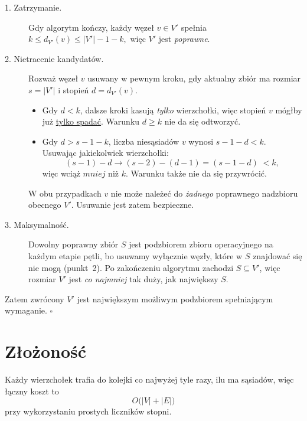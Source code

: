 \documentclass[11pt,a4paper]{article}
\begin{document}
\begin{description}
\item[1. Zatrzymanie.]
   Gdy algorytm kończy, każdy węzeł $v\in V'$
   spełnia
   \(
     k\le d_{V'}(v)\le |V'|-1-k,
   \)
   więc $V'$ jest \emph{poprawne}.

\item[2. Nietracenie kandydatów.]
   Rozważ węzeł $v$ usuwany w pewnym kroku,
   gdy aktualny zbiór ma rozmiar $s=|V'|$ i
   stopień $d=d_{V'}(v)$.

   \begin{itemize}
   \item Gdy $d<k$,
         dalsze kroki kasują \emph{tylko} wierzchołki,
         więc stopień $v$ mógłby już
         \underline{tylko spadać}.
         Warunku $d\ge k$ nie da się odtworzyć.

   \item Gdy $d> s-1-k$,
         liczba niesąsiadów $v$ wynosi
         $s-1-d<k$.
         Usuwając jakiekolwiek wierzchołki:
         \[
           (s-1)\!-\!d \longrightarrow (s-2)\!-\!(d-1)
           =(s-1-d)\;<k,
         \]
         więc wciąż $mniej$ niż $k$.
         Warunku także nie da się przywrócić.
   \end{itemize}
   W obu przypadkach $v$ nie może należeć
   do \emph{żadnego} poprawnego nadzbioru
   obecnego $V'$.  Usuwanie jest zatem bezpieczne.

\item[3. Maksymalność.]
   Dowolny poprawny zbiór $S$
   jest podzbiorem zbioru operacyjnego
   na każdym etapie pętli,
   bo usuwamy wyłącznie węzły,
   które w $S$ znajdować się nie mogą
   (punkt~2).
   Po zakończeniu algorytmu
   zachodzi $S\subseteq V'$,
   więc rozmiar $V'$ jest
   \emph{co najmniej} tak duży, jak największy $S$.
\end{description}

Zatem zwrócony $V'$ jest największym
możliwym podzbiorem spełniającym wymaganie.
\hfill$\square$

\section*{Złożoność}

Każdy wierzchołek trafia do kolejki
co najwyżej tyle razy, ilu ma sąsiadów,
więc łączny koszt to
\[
  O\bigl(|V|+|E|\bigr)
\]
przy wykorzystaniu prostych liczników stopni.
\end{document}
